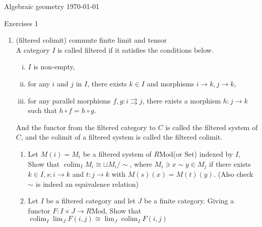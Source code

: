 \documentclass[a4paper,11pt]{article}
\def\mrm#1{\mathrm{#1}}
\def\Mod#1{#1\mathrm{Mod}}
\DeclareMathOperator{\colim}{colim}
\begin{document}
{\small Algebraic geometry \hfill \today \\}
\begin{center}
\Huge Exercises 1
\end{center}
\vskip0.6cm
\begin{enumerate}[1.]
\item (filtered colimit) commute finite limit and tensor\\
A category $I$ is called filtered if it satisfies the conditions below.
\begin{enumerate}[(i)]
    \item  $I$ is non-empty,
    \item  for any $i$ and $j$ in $I$, there exists $k \in I$ and morphisms $i \to k, j \to k$,
    \item for any parallel morphisms $f,g: i \rightrightarrows  j$, there exists a morphism $h: j \to
    k$ such that $h \circ  f = h \circ g$.
\end{enumerate}
And the functor from the filtered category to $C$ is called the filtered system of $C$, and the colimit of a filtered system is called the filtered colimit.
\begin{enumerate}
    \item Let $M(i)=M_i$ be a filtered system of $\Mod{R}$(or $\mrm{Set}$) indexed by $I$, Show that $\colim_I M_i\cong \sqcup M_i/ \sim$, where $M_i \ni x \sim y \in M_j$ if there exists $k \in I, s: i \to k$ and $ t: j \to k$
    with $ M(s)(x) = M(t)(y)$. (Also check $\sim$ is indeed an equivalence relation)
    \item Let $I$ be a filtered category and let $J$ be a finite category. Giving a functor $F: I\times J \to \Mod{R}$, Show that $\colim_I\lim_J F(i,j)\cong\lim_J\colim_I F(i,j)$
\end{enumerate}


\end{enumerate}
\end{document}
